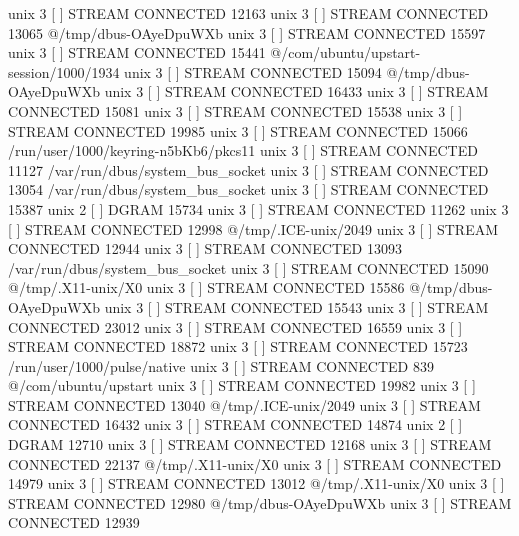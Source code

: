 unix  3      [ ]         STREAM     CONNECTED     12163    
unix  3      [ ]         STREAM     CONNECTED     13065    @/tmp/dbus-OAyeDpuWXb
unix  3      [ ]         STREAM     CONNECTED     15597    
unix  3      [ ]         STREAM     CONNECTED     15441    @/com/ubuntu/upstart-session/1000/1934
unix  3      [ ]         STREAM     CONNECTED     15094    @/tmp/dbus-OAyeDpuWXb
unix  3      [ ]         STREAM     CONNECTED     16433    
unix  3      [ ]         STREAM     CONNECTED     15081    
unix  3      [ ]         STREAM     CONNECTED     15538    
unix  3      [ ]         STREAM     CONNECTED     19985    
unix  3      [ ]         STREAM     CONNECTED     15066    /run/user/1000/keyring-n5bKb6/pkcs11
unix  3      [ ]         STREAM     CONNECTED     11127    /var/run/dbus/system_bus_socket
unix  3      [ ]         STREAM     CONNECTED     13054    /var/run/dbus/system_bus_socket
unix  3      [ ]         STREAM     CONNECTED     15387    
unix  2      [ ]         DGRAM                    15734    
unix  3      [ ]         STREAM     CONNECTED     11262    
unix  3      [ ]         STREAM     CONNECTED     12998    @/tmp/.ICE-unix/2049
unix  3      [ ]         STREAM     CONNECTED     12944    
unix  3      [ ]         STREAM     CONNECTED     13093    /var/run/dbus/system_bus_socket
unix  3      [ ]         STREAM     CONNECTED     15090    @/tmp/.X11-unix/X0
unix  3      [ ]         STREAM     CONNECTED     15586    @/tmp/dbus-OAyeDpuWXb
unix  3      [ ]         STREAM     CONNECTED     15543    
unix  3      [ ]         STREAM     CONNECTED     23012    
unix  3      [ ]         STREAM     CONNECTED     16559    
unix  3      [ ]         STREAM     CONNECTED     18872    
unix  3      [ ]         STREAM     CONNECTED     15723    /run/user/1000/pulse/native
unix  3      [ ]         STREAM     CONNECTED     839      @/com/ubuntu/upstart
unix  3      [ ]         STREAM     CONNECTED     19982    
unix  3      [ ]         STREAM     CONNECTED     13040    @/tmp/.ICE-unix/2049
unix  3      [ ]         STREAM     CONNECTED     16432    
unix  3      [ ]         STREAM     CONNECTED     14874    
unix  2      [ ]         DGRAM                    12710    
unix  3      [ ]         STREAM     CONNECTED     12168    
unix  3      [ ]         STREAM     CONNECTED     22137    @/tmp/.X11-unix/X0
unix  3      [ ]         STREAM     CONNECTED     14979    
unix  3      [ ]         STREAM     CONNECTED     13012    @/tmp/.X11-unix/X0
unix  3      [ ]         STREAM     CONNECTED     12980    @/tmp/dbus-OAyeDpuWXb
unix  3      [ ]         STREAM     CONNECTED     12939    
